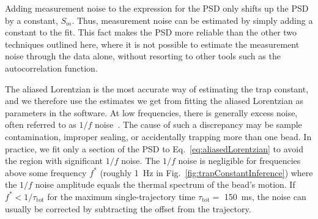 \documentclass[hyperref={colorlinks=true, urlcolor=blue, citecolor=blue, final, bound}]{sfuthesis}
\begin{document}
Adding measurement noise to the expression for the PSD only shifts up the PSD by a constant, $S_m$. Thus, measurement noise can be estimated by simply adding a constant to the fit. This fact makes the PSD more reliable than the other two techniques outlined here, where it is not possible to estimate the measurement noise through the data alone, without resorting to other tools such as the autocorrelation function.

The aliased Lorentzian is the most accurate way of estimating the trap constant, and we therefore use the estimates we get from fitting the aliased Lorentzian as parameters in the software. At low frequencies, there is generally excess noise, often referred to as $1/f$ noise~\cite{Weissman1988}. The cause of such a discrepancy may be sample contamination, improper sealing, or accidentally trapping more than one bead. In practice, we fit only a section of the PSD to Eq.~\ref{eq:aliasedLorentzian} to avoid the region with significant $1/f$ noise. The $1/f$ noise is negligible for frequencies above some frequency $f^*$ (roughly \qty{1}{\hertz} in Fig.~\ref{fig:trapConstantInference}) where the $1/f$ noise amplitude equals the thermal spectrum of the bead's motion. If $f^*<1/\tau_{\mathrm{tot}}$ for the maximum single-trajectory time $\tau_{\mathrm{tot}}=$ \qty{150}{\milli\second}, the noise can usually be corrected by subtracting the offset from the trajectory.
\end{document}
